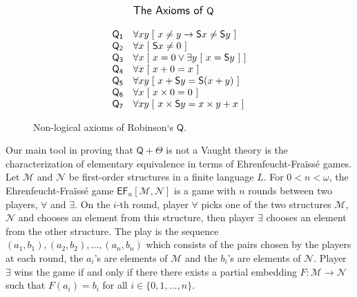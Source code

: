 \documentclass[10pt,a4paper, openany,  oldfontcommands]{memoir}
\newtheorem{open problem} [theorem] {Open Problem}
\newtheorem{open question} [theorem] {Open Question}
\renewcommand{\mathrm}{\mathsf}
\begin{document}
\begin{figure}




\[
\begin{array}{r l  c  c r l  }
& {\large \textsf{The Axioms of } \mathsf{Q} }
\\
\\
 \mathsf{Q_1}  
& \forall x   y \;  [ \  x \neq y \rightarrow \mathrm{S}  x \neq \mathrm{S}  y    \ ]   
\\
\mathsf{Q_2} 
& \forall x \;   [ \   \mathrm{S}  x \neq 0 \  ] 
\\
 \mathsf{Q_3}  
& \forall x  \;   [ \  x=0 \vee \exists y \;  [ \ x = \mathrm{S}  y \  ]     \ ]   
\\
 \mathsf{Q_4}  
&  \forall x  \;   [ \  x+0 = x  \ ]   
\\
 \mathsf{Q_5}  
& \forall x  y \;   [ \  x+ \mathrm{S}  y = \mathrm{S}  ( x+y)   \ ] 
\\
 \mathsf{Q_6} 
&  \forall x  \;   [ \  x \times 0 = 0  \ ]
\\
 \mathsf{Q_7} 
&  \forall x  y  \;  [ \  x \times  \mathrm{S}  y =   x \times y   + x   \ ]  
\end{array}
\] 





\caption{
Non-logical axioms of Robinson`s $ \mathsf{Q} $.
}
\label{AxiomsOfQ}
\end{figure}

















Our main tool in  proving that    $  \mathsf{Q} + \Theta  $   is  not a  Vaught theory  is the characterization of elementary equivalence in terms of   Ehrenfeucht-Fra\"iss\'e games.  
Let   $  \mathcal{M} $ and  $  \mathcal{N} $ be first-order  structures in a finite  language  $L$. 
For $ 0 < n  <  \omega $,   the   Ehrenfeucht-Fra\"iss\'e game  $  \mathsf{EF}_n  \left[    \mathcal{M}  ,  \mathcal{N}   \right] $  
is a game with $n$ rounds between two  players,   $  \forall $  and  $  \exists $. 
On the $i$-th round, player $  \forall $   picks one of the two structures $  \mathcal{M} $, $  \mathcal{N} $ and   chooses an element from this structure, 
then  player $  \exists $ chooses an element from the other structure. 
The play is the   sequence $  (a_1, b_1 ) ,   (a_2, b_2 ) ,  \ldots ,   (a_n , b_n ) $   which consists of the pairs chosen by the players at each round, 
the $ a_i$'s are elements of  $ \mathcal{M}  $ and the $ b_i$'s are elements of $ \mathcal{N}  $.
Player $  \exists $ wins the game if and only if there there exists  a partial embedding  $  F:    \mathcal{M}  \to   \mathcal{N}  $  
such that  $  F(a_i)  =  b_i $  for all $  i  \in  \lbrace  0,1  ,  \ldots ,  n  \rbrace  $. 
\end{document}
